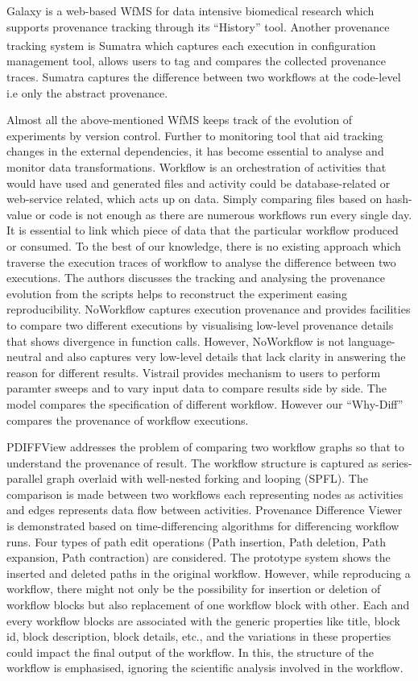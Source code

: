 \documentclass[10pt,conference,twocolumn]{IEEEtran}
\begin{document}
Galaxy is a web-based WfMS for data intensive biomedical research which supports provenance tracking through its \enquote{History} tool. Another provenance tracking system is Sumatra \textsuperscript{\cite{davison2012}} which captures each execution in configuration management tool, allows users to tag and compares the collected provenance traces. Sumatra captures the difference between two workflows at the code-level i.e only the abstract provenance. 

Almost all the above-mentioned WfMS keeps track of the evolution of experiments by version control. Further to monitoring tool that aid tracking changes in the external dependencies, it has become essential to analyse and monitor data transformations. Workflow is an orchestration of activities that would have used and generated files and activity could be database-related or web-service related, which acts up on data. Simply comparing files based on hash-value or code is not enough as there are numerous workflows run every single day. It is essential to link which piece of data that the particular workflow produced or consumed. To the best of our knowledge, there is no existing approach which traverse the execution traces of workflow to analyse the difference between two executions.
 The authors \cite{Pimentel2016} discusses the tracking and analysing the provenance evolution from the scripts helps to reconstruct the experiment easing reproducibility. NoWorkflow captures execution provenance and provides facilities to compare two different executions by visualising low-level provenance details that shows divergence in function calls. However, NoWorkflow is not language-neutral and also captures very low-level details that lack clarity in answering the reason for different results. Vistrail \cite{Vistrail} provides mechanism to users to perform paramter sweeps and to vary input data to compare results side by side. The model compares the specification of different workflow. However our \enquote{Why-Diff} compares the provenance of workflow executions. 

PDIFFView \cite{Bao2009} addresses the problem of comparing two workflow graphs so that to understand the provenance of result. The workflow structure is captured as series-parallel graph overlaid with well-nested forking and looping (SPFL). The comparison is made between two workflows each representing nodes as activities and edges represents data flow between activities. Provenance Difference Viewer \cite{Bao} is demonstrated based on time-differencing algorithms for differencing workflow runs. Four types of path edit operations (Path insertion, Path deletion, Path expansion, Path contraction) are considered. The prototype system shows the inserted and deleted paths in the original workflow. However, while reproducing a workflow, there might not only be the possibility for insertion or deletion of workflow blocks but also replacement of one workflow block with other. Each and every workflow blocks are associated with the generic properties like title, block id,  block description, block details, etc., and the variations in these properties could impact the final output of the workflow. In this, the structure of the workflow is emphasised, ignoring the scientific analysis involved in the workflow. 
\end{document}
